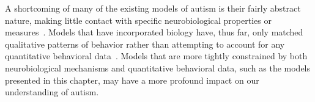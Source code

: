 A shortcoming of many of the existing models of autism is their fairly abstract nature, making little contact with specific neurobiological properties or measures~\cite{CohenIL:1994:AutismLearning,McClellandJL:2000:Autism,OLoughlinC:2000:Coherence}. Models that have incorporated biology have, thus far, only matched qualitative patterns of behavior rather than attempting to account for any quantitative behavioral data~\cite{GustafssonL:1997:AutismMaps,GrossbergS:2006:Autism}. Models that are more tightly constrained by both neurobiological mechanisms and quantitative behavioral data, such as the models presented in this chapter, may have a more profound impact on our understanding of autism.
